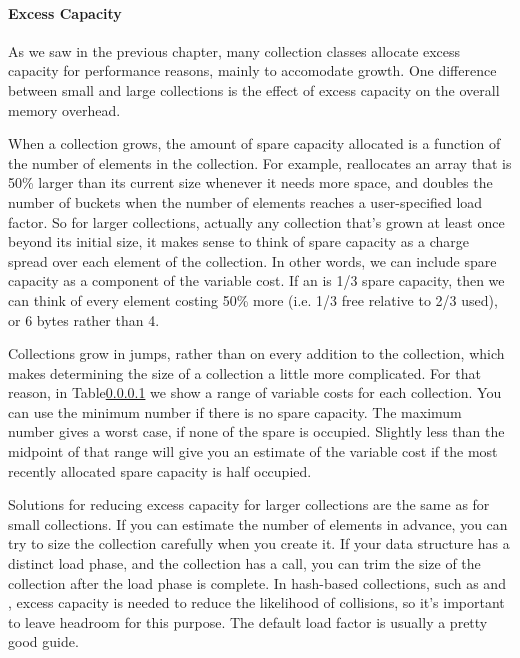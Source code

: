 
\paragraph{Excess Capacity}

As we saw in the previous chapter, many collection
classes allocate excess capacity for performance reasons, mainly to accomodate
growth. One difference between small and large collections is the
effect of excess capacity on the overall memory overhead.  

When a collection grows, the amount of spare
capacity allocated is a function of the number of elements in
the collection. For example,  reallocates an array that is 50\%
larger than its current size whenever it needs more space, and 
doubles the number of buckets when the number of elements reaches a
user-specified load factor. So for larger collections, actually any collection
that's grown at least once beyond its initial size, it makes
sense to think of spare capacity as a charge spread over each element of the collection.  In
other words, we can include spare capacity as a component of the variable cost.
If an  is 1/3 spare capacity, then we can think of every
element costing 50\% more (i.e. 1/3 free relative to 2/3 used), or 6 bytes
rather than 4.

Collections grow in jumps, rather than on every addition to the
collection, which makes determining the size of a collection a little
more complicated.  For that reason, in Table\ref{} we show
a range of variable costs for each collection.  You can use the minimum
number if there is no spare capacity. The maximum number gives a worst case, if
none of the spare is occupied. Slightly less than the midpoint of
that range will give you an estimate of the variable cost if the most recently
allocated spare capacity is half occupied.

Solutions for reducing excess capacity for larger collections are the same as
for small collections. If you can estimate the number of elements in advance,
you can try to size the collection carefully when you create it.  If your data structure has a
distinct load phase, and the collection has a  call, you can
trim the size of the collection after the load phase is complete. In hash-based collections, such as
 and , excess capacity is needed to reduce the
likelihood of collisions, so it's important to leave headroom for this
purpose. The default load factor is usually a pretty good guide. 

